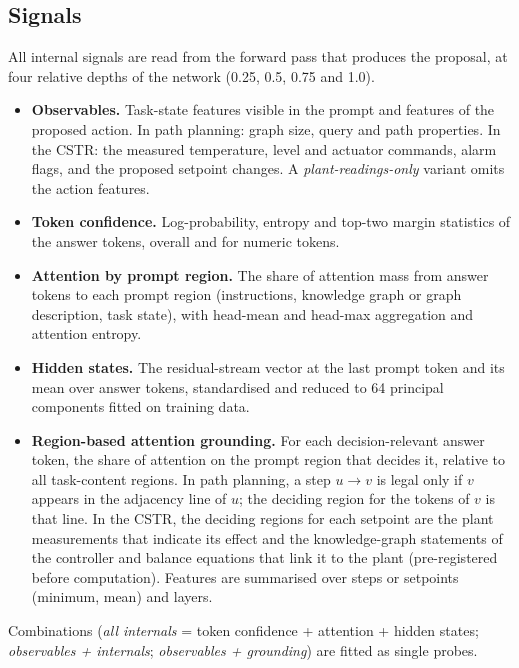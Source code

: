 \subsection{Signals}
All internal signals are read from the forward pass that produces the proposal, at four relative depths of the
network (0.25, 0.5, 0.75 and 1.0).
\begin{itemize}
\item \textbf{Observables.} Task-state features visible in the prompt and features of the proposed action. In path
planning: graph size, query and path properties. In the CSTR: the measured temperature, level and actuator commands,
alarm flags, and the proposed setpoint changes. A \emph{plant-readings-only} variant omits the action features.
\item \textbf{Token confidence.} Log-probability, entropy and top-two margin statistics of the answer tokens, overall
and for numeric tokens.
\item \textbf{Attention by prompt region.} The share of attention mass from answer tokens to each prompt region
(instructions, knowledge graph or graph description, task state), with head-mean and head-max aggregation and
attention entropy.
\item \textbf{Hidden states.} The residual-stream vector at the last prompt token and its mean over answer tokens,
standardised and reduced to 64 principal components fitted on training data.
\item \textbf{Region-based attention grounding.} For each decision-relevant answer token, the share of attention on
the prompt region that decides it, relative to all task-content regions. In path planning, a step $u\to v$ is legal
only if $v$ appears in the adjacency line of $u$; the deciding region for the tokens of $v$ is that line. In the CSTR,
the deciding regions for each setpoint are the plant measurements that indicate its effect and the knowledge-graph
statements of the controller and balance equations that link it to the plant (pre-registered before computation).
Features are summarised over steps or setpoints (minimum, mean) and layers.
\end{itemize}
Combinations (\emph{all internals} = token confidence + attention + hidden states; \emph{observables + internals};
\emph{observables + grounding}) are fitted as single probes.

